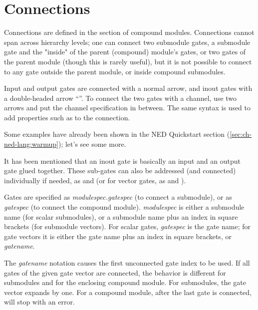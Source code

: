 \section{Connections}
\label{sec:ch-ned-lang:connections}

Connections are defined in the  section of compound
modules. Connections cannot span across hierarchy levels; one can connect
two submodule gates, a submodule gate and the "inside" of the parent
(compound) module's gates, or two gates of the parent module (though this
is rarely useful), but it is not possible to connect to any gate outside the
parent module, or inside compound submodules.

Input and output gates are connected with a normal arrow, and inout gates
with a double-headed arrow ``\ttt{<-{}->}''. To connect the two gates
with a channel, use two arrows and put the channel specification in between.
The same syntax is used to add properties such as  to the
connection.

Some examples have already been shown in the NED Quickstart section
(\ref{sec:ch-ned-lang:warmup}); let's see some more.



It has been mentioned that an inout gate is basically an input and an
output gate glued together. These sub-gates can also be addressed (and
connected) individually if needed, as  and  (or
for vector gates, as  and ).


Gates are specified as \textit{modulespec.gatespec} (to connect a submodule),
or as \textit{gatespec} (to connect the compound module). \textit{modulespec}
is either a submodule name (for scalar submodules), or a submodule name plus
an index in square brackets (for submodule vectors). For scalar gates,
\textit{gatespec} is the gate name; for gate vectors it is either the gate name
plus an index in square brackets, or \textit{gatename}\ttt{++}.

The \textit{gatename}\ttt{++} notation causes the first unconnected gate index
to be used. If all gates of the given gate vector are connected, the behavior
is different for submodules and for the enclosing compound module.
For submodules, the gate vector expands by one. For a compound module,
after the last gate is connected, \ttt{++} will stop with an error.

